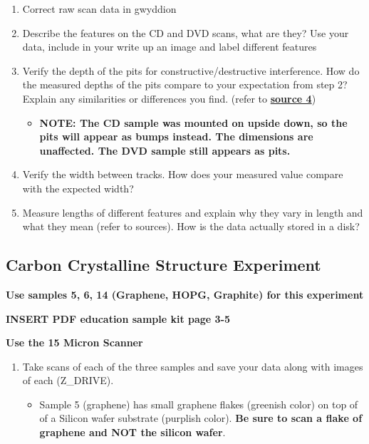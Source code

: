 \documentclass{../lab}
\begin{document}
{\begin{enumerate}
    \item Correct raw scan data in gwyddion

    \item Describe the features on the CD and DVD scans, what are they? Use your data, include in your write up an image and label different features

    \item Verify the depth of the pits for constructive/destructive interference. How do the measured depths of the pits compare to your expectation from step 2?  Explain any similarities or differences you find.  (refer to \href{http://www.scientificamerican.com/article/how-do-rewriteable-cds-wo/}{\textbf{source 4}})

    \begin{itemize}
        \item ​​\textbf{NOTE: The CD sample was mounted on upside down, so the pits will appear as bumps instead.  The dimensions are unaffected.  The DVD sample still appears as pits.}

    \end{itemize}

    \item Verify the width between tracks. How does your measured value compare with the expected width?

    \item Measure lengths of different features and explain why they vary in length and what they mean (refer to sources).  How is the data actually stored in a disk?

\end{enumerate}

\subsection{Carbon Crystalline Structure Experiment}

\textbf{Use samples 5, 6, 14 (Graphene, HOPG, Graphite) for this experiment}

\textbf{INSERT PDF education sample kit page 3-5}

\textbf{Use the 15 Micron Scanner }

\begin{enumerate}
    \item Take scans of each of the three samples and save your data along with images of each (Z\_DRIVE).

    \begin{itemize}
        \item Sample 5 (graphene) has small graphene flakes (greenish color) on top of of a Silicon wafer substrate (purplish color). \textbf{Be sure to scan a flake of graphene and NOT the silicon wafer}.


\end{itemize}
\end{enumerate}}
\end{document}
